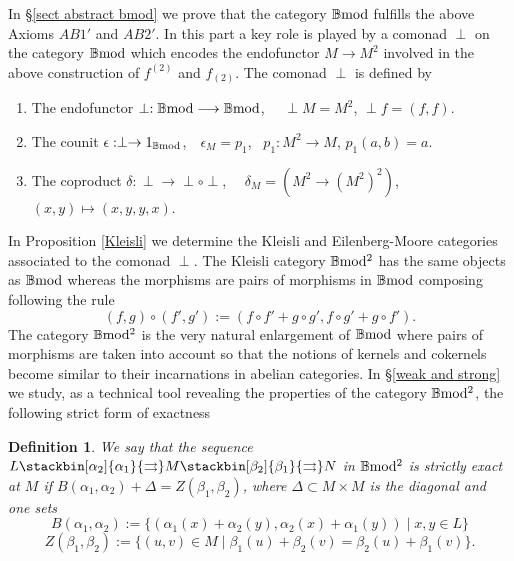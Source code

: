 \documentclass[12pt]{article}
\newtheorem{defn}[thm]{Definition}
\def\B{{\mathbb B}}
\def\strg{strict }
\def\strgly{strictly }
\def\bmod{{\rm \B mod}}
\def\bm2{{\rm \B mod^2}}
\begin{document}
In \S\ref{sect abstract bmod} we prove that the category $\bmod$ fulfills the above Axioms $AB1'$ and $AB2'$. In this part  a key role is played by  a  comonad $\perp$ on the category $\bmod$ which encodes the endofunctor $M\longrightarrow M^2$ involved in the above construction of $f^{(2)}$ and $f_{(2)}$. The  comonad $\perp$ is defined by
\begin{enumerate}
	\item The endofunctor $\perp:\bmod\longrightarrow \bmod$,~~ $\perp M = M^2$, $\perp f=(f,f)$.
	\item The counit $\epsilon: \perp \to 1_{\bmod}$,~~$\epsilon_M = p_1$,~ $p_1:M^2 \to M$, $p_1(a,b)=a$.
	\item The coproduct $\delta:\perp \to \perp\circ\perp$,~~ $\delta_M= (M^2 \to (M^2)^2)$, ~$(x,y)\mapsto (x,y,y,x)$. 
\end{enumerate}	
   In Proposition \ref{Kleisli} we determine the  Kleisli and Eilenberg-Moore categories associated to the comonad $\perp$. The Kleisli category $\bm2$ has the same objects as $\bmod$ whereas the morphisms are  pairs of morphisms in $\bmod$ composing  following the rule
\begin{equation}\label{paircompfirstintro}
	(f,g)\circ (f',g'):=(f\circ f'+g\circ g', f\circ g'+g\circ f').
\end{equation}
The category $\bm2$ is the very natural enlargement of $\bmod$ where pairs of morphisms  are taken into account so that the notions of kernels and cokernels become similar to their incarnations in abelian categories.   In \S\ref{weak and strong} we study, as a technical tool revealing the properties of the category $\bm2$, the following \strg form of exactness 
\begin{defn}\label{exsequ intro} We say that the sequence  $L \stackbin[\alpha_2]{\alpha_1}{\rightrightarrows}M\stackbin[\beta_2]{\beta_1}{\rightrightarrows}N$ in $\bm2$ is {\em \strgly exact} at $M$ if  $ B(\alpha_1,\alpha_2)+\Delta=Z(\beta_1,\beta_2)$, where $\Delta\subset M\times M$ is the diagonal and one sets
\begin{equation}	
\label{exactseqstr}
B(\alpha_1,\alpha_2):=\{(\alpha_1(x)+\alpha_2(y),\alpha_2(x)+\alpha_1(y))\mid x,y\in L\}
\end{equation}
\begin{equation}	
\label{exactseqstr2}
Z(\beta_1,\beta_2):=\{(u,v)\in M\mid \beta_1(u)+\beta_2(v)=\beta_2(u)+\beta_1(v)\}.
\end{equation}

	\end{defn}
\end{document}
